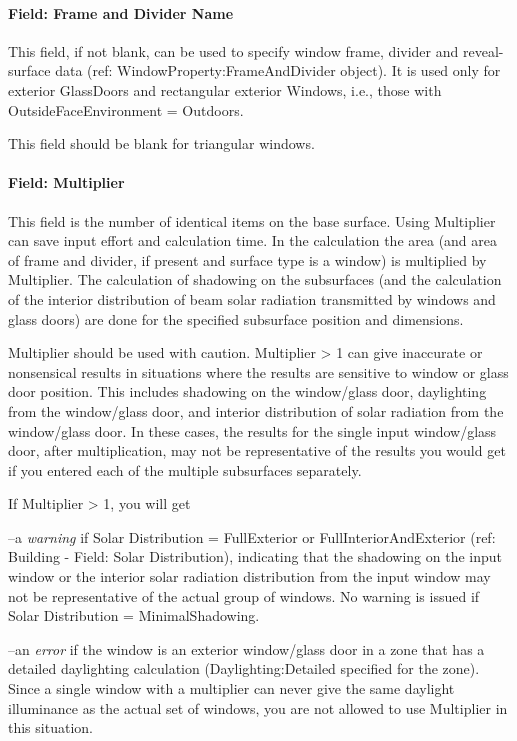 \paragraph{Field: Frame and Divider Name}\label{field-frame-and-divider-name}

This field, if not blank, can be used to specify window frame, divider and reveal-surface data (ref: WindowProperty:FrameAndDivider object). It is used only for exterior GlassDoors and rectangular exterior Windows, i.e., those with OutsideFaceEnvironment = Outdoors.

This field should be blank for triangular windows.

\paragraph{Field: Multiplier}\label{field-multiplier-1}

This field is the number of identical items on the base surface. Using Multiplier can save input effort and calculation time. In the calculation the area (and area of frame and divider, if present and surface type is a window) is multiplied by Multiplier. The calculation of shadowing on the subsurfaces (and the calculation of the interior distribution of beam solar radiation transmitted by windows and glass doors) are done for the specified subsurface position and dimensions.

Multiplier should be used with caution. Multiplier \textgreater{} 1 can give inaccurate or nonsensical results in situations where the results are sensitive to window or glass door position. This includes shadowing on the window/glass door, daylighting from the window/glass door, and interior distribution of solar radiation from the window/glass door. In these cases, the results for the single input window/glass door, after multiplication, may not be representative of the results you would get if you entered each of the multiple subsurfaces separately.

If Multiplier \textgreater{} 1, you will get

--a \emph{warning} if Solar Distribution = FullExterior or FullInteriorAndExterior (ref: Building - Field: Solar Distribution), indicating that the shadowing on the input window or the interior solar radiation distribution from the input window may not be representative of the actual group of windows. No warning is issued if Solar Distribution = MinimalShadowing.

--an \emph{error} if the window is an exterior window/glass door in a zone that has a detailed daylighting calculation (Daylighting:Detailed specified for the zone). Since a single window with a multiplier can never give the same daylight illuminance as the actual set of windows, you are not allowed to use Multiplier in this situation.

